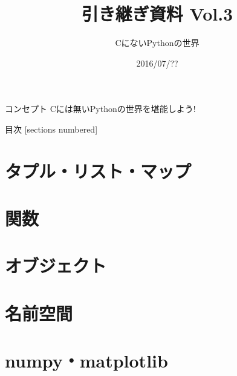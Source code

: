 \documentclass[12pt, xetex, xcolor=pdftex, dvipsnames]{beamer}
\title{引き継ぎ資料 Vol.3}
\subtitle{CにないPythonの世界}
\date{2016/07/??}
\author{}
\institute{}
\begin{document}
\maketitle
\begin{frame}{コンセプト}
    Cには無いPythonの世界を堪能しよう!
\end{frame}
\begin{frame}{目次}
  [sections numbered]
  \tableofcontents[hideallsubsections]
\end{frame}
\section{タプル・リスト・マップ}
\section{関数}
\section{オブジェクト}
\section{名前空間}
\section{numpy・matplotlib}
\end{document}
